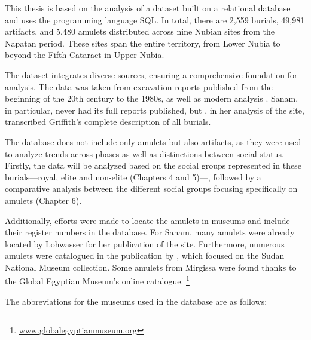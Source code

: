 This thesis is based on the analysis of a dataset built on a relational database and uses the programming language SQL. In total, there are 2,559 burials, 49,981 artifacts, and 5,480 amulets distributed across nine Nubian sites from the Napatan period. These sites span the entire territory, from Lower Nubia to beyond the Fifth Cataract in Upper Nubia.


The dataset integrates diverse sources, ensuring a comprehensive foundation for analysis. The data was taken from excavation reports published from the beginning of the 20th century to the 1980s, as well as modern analysis \parencites{griffithOxfordExcavationsNubia1923, dunhamElKurru1950, dunhamNuri1955, dunhamWestSouthCemeteries1963, geusCimetièreXXVèmeDynastie1975, vilaNécropoleMissiminiaSépultures1980, säve-söderberghScandinavianJointExpedition1989, säve-söderberghScandinavianJointExpedition1989a, williamsExcavationsAbuSimbel1990, lohwasserAspekteNapatanischenGesellschaft2012}. Sanam, in particular, never had its full reports published, but \textcite{lohwasserAspekteNapatanischenGesellschaft2012}, in her analysis of the site, transcribed Griffith’s complete description of all burials.

The database does not include only amulets but also artifacts, as they were used to analyze trends across phases as well as distinctions between social status. Firstly, the data will be analyzed based on the social groups represented in these burials—royal, elite and non-elite (Chapters 4 and 5)—, followed by a comparative analysis between the different social groups focusing specifically on amulets (Chapter 6).


Additionally, efforts were made to locate the amulets in museums and include their register numbers in the database. For Sanam, many amulets were already located by Lohwasser for her publication of the site. Furthermore, numerous amulets were catalogued in the publication by \textcites{kormyshevaGodsDivineSymbols2006}, which focused on the Sudan National Museum collection. Some amulets from Mirgissa were found thanks to the Global Egyptian Museum’s online catalogue. \footnote{\href{http://www.globalegyptianmuseum.org}{www.globalegyptianmuseum.org}}

The abbreviations for the museums used in the database are as follows:

